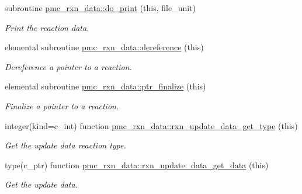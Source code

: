 \begin{DoxyCompactItemize}
subroutine \mbox{\hyperlink{namespacepmc__rxn__data_ae01999e646da4760c3c3f4a9f7a48b59}{pmc\+\_\+rxn\+\_\+data\+::do\+\_\+print}} (this, file\+\_\+unit)
\begin{DoxyCompactList}\small\item\em Print the reaction data. \end{DoxyCompactList}\item 
elemental subroutine \mbox{\hyperlink{namespacepmc__rxn__data_a40c9f4798445877bcb9f78ccbbf0d231}{pmc\+\_\+rxn\+\_\+data\+::dereference}} (this)
\begin{DoxyCompactList}\small\item\em Dereference a pointer to a reaction. \end{DoxyCompactList}\item 
elemental subroutine \mbox{\hyperlink{namespacepmc__rxn__data_a3115ac7ab9ddc7e122ec1bb8df18500a}{pmc\+\_\+rxn\+\_\+data\+::ptr\+\_\+finalize}} (this)
\begin{DoxyCompactList}\small\item\em Finalize a pointer to a reaction. \end{DoxyCompactList}\item 
integer(kind=c\+\_\+int) function \mbox{\hyperlink{namespacepmc__rxn__data_af7376f50bad1c8b21e68568ed7dfdf81}{pmc\+\_\+rxn\+\_\+data\+::rxn\+\_\+update\+\_\+data\+\_\+get\+\_\+type}} (this)
\begin{DoxyCompactList}\small\item\em Get the update data reaction type. \end{DoxyCompactList}\item 
type(c\+\_\+ptr) function \mbox{\hyperlink{namespacepmc__rxn__data_a5eb5b555b9ce82e70a70568f33e97b46}{pmc\+\_\+rxn\+\_\+data\+::rxn\+\_\+update\+\_\+data\+\_\+get\+\_\+data}} (this)
\begin{DoxyCompactList}\small\item\em Get the update data. \end{DoxyCompactList}\end{DoxyCompactItemize}

